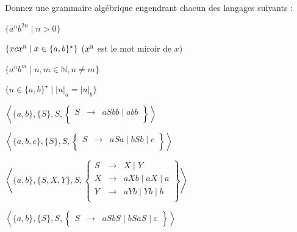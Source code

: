 
\begingroup

\begin{exercice}\label{exo:parsing/grammars/write_grammars}

  Donnez une grammaire algébrique engendrant chacun des langages suivants :
  \begin{questions}
  \item $\{ a^n b^{2n} \mid  n > 0\}$
  \item $\{x c x^\textsc{r} \mid  x \in \{a, b\}^\star  \}$ ($x^\textsc{r}$ est le mot miroir de $x$)
  \item $\{ a^n b^m \mid  n, m \in \mathbb{N}, n \neq m \}$
  \item $\{u \in \{a, b\}^\star  \mid  |u|_a = |u|_b \}$
  \end{questions}

\end{exercice}

\begin{corrections}

  \begin{questions}
  \item $\left\langle \{a, b\}, \{S\}, S,
    \left\{\begin{array}{lll}
    S   &\rightarrow& a S bb \mid a bb\\
    \end{array}\right\}\right\rangle$
  \item $\left\langle \{a, b, c\}, \{S\}, S,
    \left\{\begin{array}{lll}
    S   &\rightarrow& a S a \mid b S b \mid c\\
    \end{array}\right\}\right\rangle$
  \item $\left\langle \{a, b\}, \{S, X, Y\}, S,
    \left\{\begin{array}{lll}
    S   &\rightarrow& X \mid Y\\
    X   &\rightarrow& a X b \mid a X \mid a\\
    Y   &\rightarrow& a Y b \mid Y b \mid b\\
    \end{array}\right\}\right\rangle$
  \item $\left\langle \{a, b\}, \{S\}, S,
    \left\{\begin{array}{lll}
    S   &\rightarrow& a S b S \mid b S a S \mid \varepsilon
    \end{array}\right\}\right\rangle$
  \end{questions}

\end{corrections}

\endgroup
\endinput
